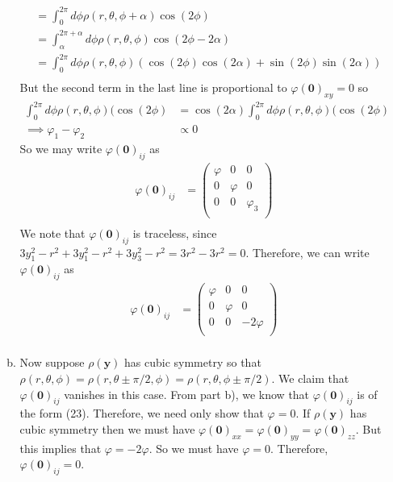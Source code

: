 \documentclass[]{book}
\begin{document}
\begin{enumerate}[1)]
\begin{enumerate}[a)]
\begin{equation}
\begin{split}
& = \int_{0}^{2\pi} d\phi \rho(r, \theta, \phi+\alpha) \cos(2\phi) \\
& = \int_{\alpha}^{2\pi+\alpha} d\phi \rho(r, \theta, \phi) \cos(2\phi-2\alpha) \\
& = \int_{0}^{2\pi} d\phi \rho(r, \theta, \phi) (\cos(2\phi)\cos(2\alpha) + \sin(2\phi)\sin(2\alpha)) \\
\end{split}
\end{equation}
But the second term in the last line is proportional to $\varphi(\textbf{0})_{xy}=0$ so
\begin{equation}
\begin{split}
\int_{0}^{2\pi} d\phi \rho(r, \theta, \phi) (\cos(2\phi) & = \cos(2\alpha) \int_{0}^{2\pi} d\phi \rho(r, \theta, \phi) (\cos(2\phi) \\
\implies \varphi_1 - \varphi_2 & \propto 0
\end{split}
\end{equation}
So we may write $\varphi(\textbf{0})_{ij}$ as
\begin{equation}
\begin{split}
\varphi(\textbf{0})_{ij} & = \left(
\begin{array}{ccc}
   \varphi & 0 & 0 \\
 0 &  \varphi & 0 \\
 0 & 0 &  
   \varphi_3\\
\end{array}
\right)\\
\end{split}
\end{equation}
We note that $\varphi(\textbf{0})_{ij}$ is traceless, since $3y_1^2 - r^2 + 3y_1^2 - r^2 + 3y_3^2 - r^2 = 3r^2 - 3r^2 = 0$. Therefore, we can write $\varphi(\textbf{0})_{ij}$ as
\begin{equation}
\begin{split}
\varphi(\textbf{0})_{ij} & = \left(
\begin{array}{ccc}
   \varphi & 0 & 0 \\
 0 &  \varphi & 0 \\
 0 & 0 &  
   -2\varphi\\
\end{array}
\right)\\
\end{split}
\end{equation}
\item 
Now suppose $\rho(\textbf{y})$ has cubic symmetry so that $\rho(r, \theta, \phi) = \rho(r, \theta \pm \pi/2, \phi) = \rho(r, \theta, \phi \pm \pi/2)$. We claim that $\varphi(\textbf{0})_{ij}$ vanishes in this case. From part b), we know that $\varphi(\textbf{0})_{ij}$ is of the form (23). Therefore, we need only show that $\varphi = 0$. If $\rho(\textbf{y})$ has cubic symmetry then we must have $\varphi(\textbf{0})_{xx} = \varphi(\textbf{0})_{yy} = \varphi(\textbf{0})_{zz}$. But this implies that $\varphi = -2\varphi$. So we must have $\varphi = 0$. Therefore, $\varphi(\textbf{0})_{ij} = 0$.
\end{enumerate}
\end{enumerate} 
\end{document}
